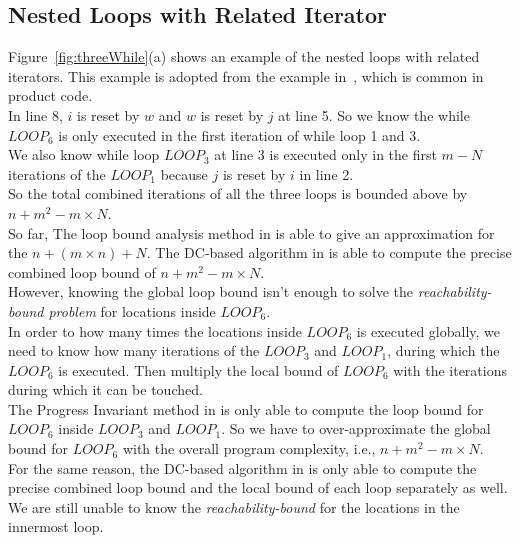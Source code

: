 \subsection{Nested Loops with Related Iterator}
\label{sec:overview-nestedwhile}
Figure~\ref{fig:threeWhile}(a) shows an example of the nested loops with related 
iterators.
This example is adopted from the example in~\cite{GulwaniJK09}, which is common in product code.
\\
In line 8, $i$ is reset by $w$ and $w$ is reset by $j$ at line 5. So we know the
while $LOOP_6$ is only executed in the first iteration of while loop 1 and 3.
\\
We also know while loop $LOOP_3$ at line 3 is executed only in 
the first $m - N$ iterations of the 
$LOOP_1$ because $j$ is reset by $i$ in line 2.
\\
So the total combined iterations of all the three loops is bounded above by 
$n + m^2 - m \times N$.
\\
So far, The loop bound analysis method in \cite{GulwaniJK09} is able to give
an approximation for the $n + (m \times n) + N$. 
The DC-based algorithm in \cite{sinn2017complexity} is able to
compute the precise combined loop bound of $n + m^2 - m \times N$.
\\
However, knowing the global loop bound isn't enough to solve the \emph{reachability-bound problem} for locations inside
$LOOP_6$.
\\
In order to how many times the locations inside
$LOOP_6$ is executed globally, we need to know
how many iterations of the $LOOP_3$ and $LOOP_1$, 
during which the $LOOP_6$ is executed.
Then multiply the local bound of $LOOP_6$ with the iterations during which it can be touched.
\\
The Progress Invariant method in \cite{GulwaniJK09} is only able to compute
the loop bound for $LOOP_6$ inside $LOOP_3$ and $LOOP_1$.
So we have to over-approximate the global bound for $LOOP_6$ with the
overall program complexity, i.e., $n + m^2 - m \times N$.
\\
For the same reason, the DC-based algorithm in \cite{sinn2017complexity}
is only able to
compute the precise combined loop bound and the local bound of each loop
separately as well.
We are still unable to know the  \emph{reachability-bound} for the locations in the innermost loop.
